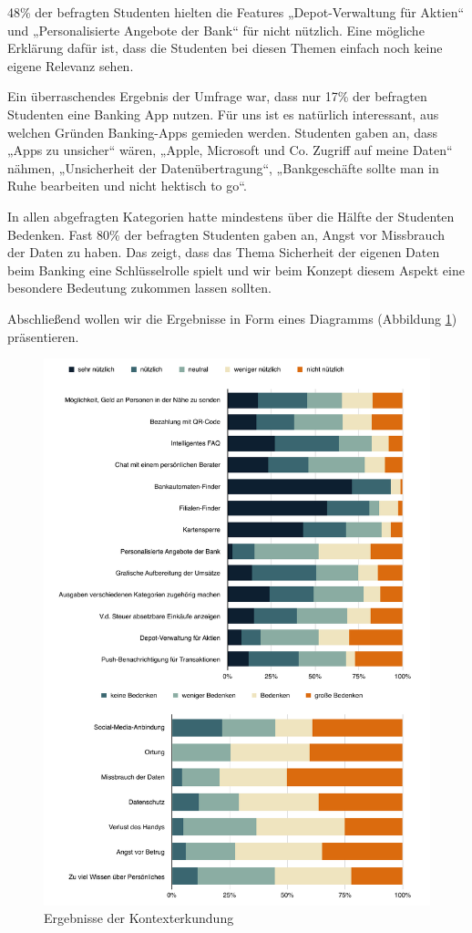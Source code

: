 	48\% der befragten Studenten hielten die Features „Depot-Verwaltung für Aktien“ und „Personalisierte Angebote der Bank“ für nicht nützlich. Eine mögliche Erklärung dafür ist, dass die Studenten bei diesen Themen einfach noch keine eigene Relevanz sehen. 
	
	Ein überraschendes Ergebnis der Umfrage war, dass nur 17\% der befragten Studenten eine Banking App nutzen. Für uns ist es natürlich interessant, aus welchen Gründen Banking-Apps gemieden werden. Studenten gaben an, dass „Apps zu unsicher“ wären, „Apple, Microsoft und Co. Zugriff auf meine Daten“ nähmen, „Unsicherheit der Datenübertragung“, „Bankgeschäfte sollte man in Ruhe bearbeiten und nicht hektisch to go“.
	
	In allen abgefragten Kategorien hatte mindestens über die Hälfte der Studenten Bedenken. Fast 80\% der befragten Studenten gaben an, Angst vor Missbrauch der Daten zu haben. Das zeigt, dass das Thema Sicherheit der eigenen Daten beim Banking eine Schlüsselrolle spielt und wir beim Konzept diesem Aspekt eine besondere Bedeutung zukommen lassen sollten.
	
	Abschließend wollen wir die Ergebnisse in Form eines Diagramms (Abbildung \ref{fig:Kontexterkundung}) präsentieren.
	
\begin{figure}[p]
	\centering
	\includegraphics[scale=.69]{Pictures/Kontexterkundung}
	\caption{Ergebnisse der Kontexterkundung \label{fig:Kontexterkundung}}
\end{figure}